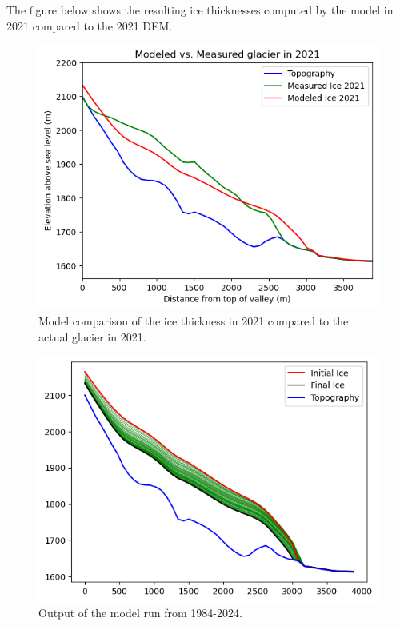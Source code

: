 \documentclass{article}
\begin{document}
The figure below shows the resulting ice thicknesses computed by the model in 2021 compared to the 2021 DEM.
\begin{figure}[h!]
    \centering
    \includegraphics[width=\textwidth]{Plots/2021_glacier_comparison.png}
    \caption{Model comparison of the ice thickness in 2021 compared to the actual glacier in 2021.}
    \label{fig:2021_glacier_comparison}
\end{figure}
\FloatBarrier
\begin{figure}[h!]
    \centering
    \includegraphics[width=\textwidth]{Plots/model_run_1984_2024.png}
    \caption{Output of the model run from 1984-2024.}
    \label{fig:model_run_1984_2024}
\end{figure}
\FloatBarrier
\end{document}
